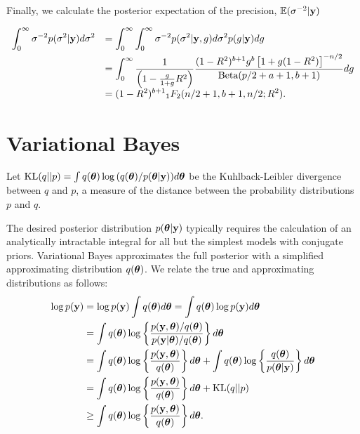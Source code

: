 \documentclass{amsart}[12pt]
\newcommand{\mgc}[1]{{\color{blue}#1}}
\begin{document}





Finally, we calculate the posterior expectation of the precision, $\mathbb{E}(\sigma^{-2}|{\bf y})$

$$
\begin{array}{rl}
	\displaystyle \int_0^\infty \sigma^{-2} p(\sigma^2|{\bf y}) d\sigma^2 
	  & \displaystyle = \int_0^\infty \int_0^\infty \sigma^{-2} p(\sigma^2|{\bf y},g) d\sigma^2 p(g|{\bf y}) dg 
	\\ [2ex]
	  & \displaystyle =  \int_0^\infty \frac{1}{\left(                                                  
	1 -
	\tfrac{g}{1+g} R^2\right)} \frac{(1 -  R^2)^{b+1} g^{b} \left[  1 + g(1 -  R^2) \right]^{-n/2}}{\mbox{Beta}(p/2 + a + 1,b+1)} dg
	\\ [2ex]
	  & \displaystyle =  (1 -  R^2)^{b+1}                                                               
	{}_1 F_2(n/2+1,b+1,n/2;R^2)  .
\end{array}
$$
\section{Variational Bayes}
\label{sec:vb}

Let $\text{KL}(q||p) = \int q({\boldsymbol \theta}) \log{\left( q({\boldsymbol\theta})/p({\boldsymbol\theta}|{\bf y}) \right)} d {\boldsymbol \theta}$ be the
Kuhlback-Leibler divergence between $q$ and $p$, a measure of the distance between the probability
distributions $p$ and $q$.

The desired posterior distribution $p({\boldsymbol \theta} | {\bf y})$ typically requires the calculation of an analytically
intractable integral for all but the simplest models with conjugate priors. Variational Bayes approximates the
full posterior with a simplified approximating distribution $q({\boldsymbol \theta})$. We relate the true and
approximating distributions as follows:
\begin{align*}
	\log p({\bf y}) & = \log p({\bf y}) \int q({\boldsymbol \theta}) d {\boldsymbol \theta} = \int q({\boldsymbol \theta}) \log p({\bf y}) d {\boldsymbol \theta}                                    \\
	            & = \int q({\boldsymbol \theta}) \log \left\{ \frac{p({\bf y}, {\boldsymbol \theta}) / q({\boldsymbol \theta})}{p({\bf y}|{\boldsymbol \theta}) / q({\boldsymbol \theta})} \right\} d {\boldsymbol \theta} \\
	            & = \int q({\boldsymbol \theta}) \log\left\{ \frac{p({\bf y}, {\boldsymbol \theta})}{q({\boldsymbol \theta})} \right\} d {\boldsymbol \theta} +                              
	\int q({\boldsymbol \theta}) \log\left\{ \frac{q({\boldsymbol \theta})}{p({\boldsymbol \theta}|{\bf y})} \right\} d {\boldsymbol \theta} \\
	            & = \int q({\boldsymbol \theta}) \log\left\{ \frac{p({\bf y}, {\boldsymbol \theta})}{q({\boldsymbol \theta})} \right\} d {\boldsymbol \theta} +                              
	\text{KL}(q||p) \\
	            & \geq \int q({\boldsymbol \theta}) \log\left\{ \frac{p({\bf y}, {\boldsymbol \theta})}{q({\boldsymbol \theta})} \right\} d {\boldsymbol \theta}.                            
\end{align*}
\end{document}
